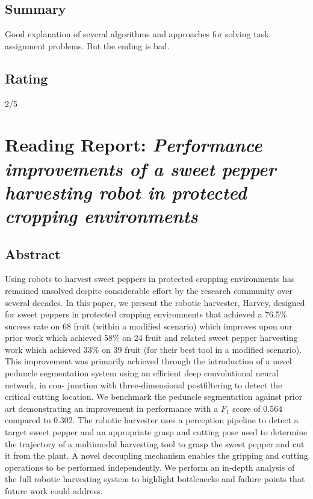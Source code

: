     \subsection*{Summary}
    Good explanation of several algorithms and approaches for solving task assignment problems. But the ending is bad.
    \subsection*{Rating}
    2/5
    
    
    \newpage
    \section{Reading Report: \emph{Performance improvements of a sweet pepper harvesting robot in protected cropping environments
    }}
    \cite{Lehnert2020}
    
    \subsection*{Abstract}
    Using robots to harvest sweet peppers in protected cropping environments has
    remained unsolved despite considerable effort by the research community over
    several decades. In this paper, we present the robotic harvester, Harvey, designed
    for sweet peppers in protected cropping environments that achieved a 76.5\%
    success rate on 68 fruit (within a modified scenario) which improves upon our prior
    work which achieved 58\% on 24 fruit and related sweet pepper harvesting work
    which achieved 33\% on 39 fruit (for their best tool in a modified scenario). This
    improvement was primarily achieved through the introduction of a novel peduncle
    segmentation system using an efficient deep convolutional neural network, in con-
    junction with three‐dimensional postfiltering to detect the critical cutting location.
    We benchmark the peduncle segmentation against prior art demonstrating
    an improvement in performance with a $F_1$ score of 0.564 compared to 0.302. The
    robotic harvester uses a perception pipeline to detect a target sweet pepper and an
    appropriate grasp and cutting pose used to determine the trajectory of a multimodal
    harvesting tool to grasp the sweet pepper and cut it from the plant. A novel
    decoupling mechanism enables the gripping and cutting operations to be performed
    independently. We perform an in‐depth analysis of the full robotic harvesting system
    to highlight bottlenecks and failure points that future work could address.
    
